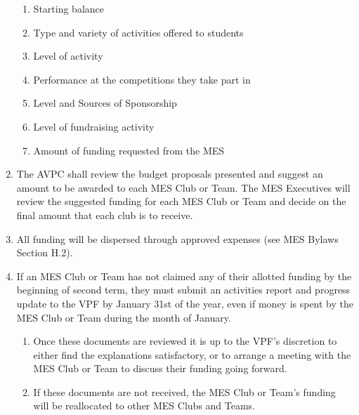 \begin{enumerate}
  \begin{enumerate}
   \item
    Starting balance
   \item
    Type and variety of activities offered to students
   \item
    Level of activity
   \item
    Performance at the competitions they take part in
   \item
    Level and Sources of Sponsorship
   \item
    Level of fundraising activity
   \item
    Amount of funding requested from the MES
  \end{enumerate}
 \item
  The AVPC shall review the budget proposals presented and suggest an
  amount to be awarded to each MES Club or Team. The MES Executives will
  review the suggested funding for each MES Club or Team and decide on
  the final amount that each club is to receive.
 \item
  All funding will be dispersed through approved expenses (see MES
  Bylaws Section H.2).
 \item
  If an MES Club or Team has not claimed any of their allotted funding
  by the beginning of second term, they must submit an activities report
  and progress update to the VPF by January 31st of the year, even if
  money is spent by the MES Club or Team during the month of January.

  \begin{enumerate}
   \item
    Once these documents are reviewed it is up to the VPF's discretion
    to either find the explanations satisfactory, or to arrange a
    meeting with the MES Club or Team to discuss their funding going
    forward.
   \item
    If these documents are not received, the MES Club or Team's funding
    will be reallocated to other MES Clubs and Teams.

  \end{enumerate}
\end{enumerate}

